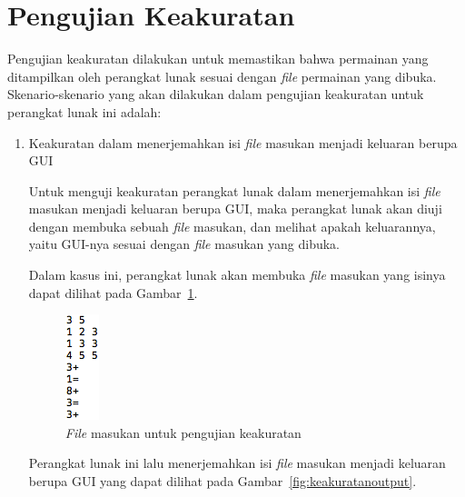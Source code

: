 \clearpage

\section{Pengujian Keakuratan}
\label{sec:pengujiankeakuratan}

Pengujian keakuratan dilakukan untuk memastikan bahwa permainan yang ditampilkan oleh perangkat lunak sesuai dengan \textit{file} permainan yang dibuka. Skenario-skenario yang akan dilakukan dalam pengujian keakuratan untuk perangkat lunak ini adalah:

\begin{enumerate}

\item Keakuratan dalam menerjemahkan isi \textit{file} masukan menjadi keluaran berupa GUI

Untuk menguji keakuratan perangkat lunak dalam menerjemahkan isi \textit{file} masukan menjadi keluaran berupa GUI, maka perangkat lunak akan diuji dengan membuka sebuah \textit{file} masukan, dan melihat apakah keluarannya, yaitu GUI-nya sesuai dengan \textit{file} masukan yang dibuka. 

Dalam kasus ini, perangkat lunak akan membuka \textit{file} masukan yang isinya dapat dilihat pada Gambar~\ref{fig:keakurataninput}.

\begin{figure}
\centering
\captionsetup{justification=centering}
\includegraphics[scale=1]{Gambar/ImplementasiPengujian/Input.png}
\caption[\textit{File} masukan untuk pengujian keakuratan]{\textit{File} masukan untuk pengujian keakuratan}
\label{fig:keakurataninput}
\end{figure}

Perangkat lunak ini lalu menerjemahkan isi \textit{file} masukan menjadi keluaran berupa GUI yang dapat dilihat pada Gambar~\ref{fig:keakuratanoutput}.


\end{enumerate}
